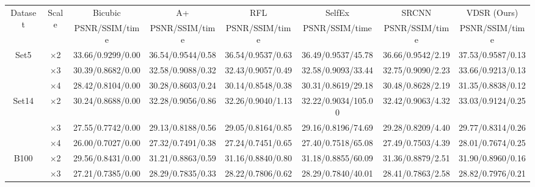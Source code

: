 \documentclass[10pt,twocolumn,letterpaper]{article}
\begin{document}
\begin{table}
\begin{center}
\setlength{\tabcolsep}{2pt}
\small
\begin{tabular}{ | c | c | c | c | c | c | c | c | }
\hline
\multirow{2}{*}{Dataset} & \multirow{2}{*}{Scale} & Bicubic & A+ & RFL & SelfEx & SRCNN & VDSR (Ours)\\
 & & PSNR/SSIM/time & PSNR/SSIM/time & PSNR/SSIM/time & PSNR/SSIM/time & PSNR/SSIM/time & PSNR/SSIM/time\\
\hline
\hline
\multirow{3}{*}{Set5} & $\times$2 & 33.66/0.9299/0.00 & 36.54/{\color{blue}0.9544}/{\color{blue}0.58} & 36.54/0.9537/0.63 & 36.49/0.9537/45.78 & {\color{blue}36.66}/0.9542/2.19 & {\color{red}37.53}/{\color{red}0.9587}/{\color{red}0.13}\\
 & $\times$3 & 30.39/0.8682/0.00 & 32.58/0.9088/{\color{blue}0.32} & 32.43/0.9057/0.49 & 32.58/{\color{blue}0.9093}/33.44 & {\color{blue}32.75}/0.9090/2.23 & {\color{red}33.66}/{\color{red}0.9213}/{\color{red}0.13}\\
 & $\times$4 & 28.42/0.8104/0.00 & 30.28/0.8603/{\color{blue}0.24} & 30.14/0.8548/0.38 & 30.31/0.8619/29.18 & {\color{blue}30.48}/{\color{blue}0.8628}/2.19 & {\color{red}31.35}/{\color{red}0.8838}/{\color{red}0.12}\\
\hline
\hline
\multirow{3}{*}{Set14} & $\times$2 & 30.24/0.8688/0.00 & 32.28/0.9056/{\color{blue}0.86} & 32.26/0.9040/1.13 & 32.22/0.9034/105.00 & {\color{blue}32.42}/{\color{blue}0.9063}/4.32 & {\color{red}33.03}/{\color{red}0.9124}/{\color{red}0.25}\\
 & $\times$3 & 27.55/0.7742/0.00 & 29.13/0.8188/{\color{blue}0.56} & 29.05/0.8164/0.85 & 29.16/0.8196/74.69 & {\color{blue}29.28}/{\color{blue}0.8209}/4.40 & {\color{red}29.77}/{\color{red}0.8314}/{\color{red}0.26}\\
 & $\times$4 & 26.00/0.7027/0.00 & 27.32/0.7491/{\color{blue}0.38} & 27.24/0.7451/0.65 & 27.40/{\color{blue}0.7518}/65.08 & {\color{blue}27.49}/0.7503/4.39 & {\color{red}28.01}/{\color{red}0.7674}/{\color{red}0.25}\\
\hline
\hline
\multirow{3}{*}{B100} & $\times$2 & 29.56/0.8431/0.00 & 31.21/0.8863/{\color{blue}0.59} & 31.16/0.8840/0.80 & 31.18/0.8855/60.09 & {\color{blue}31.36}/{\color{blue}0.8879}/2.51 & {\color{red}31.90}/{\color{red}0.8960}/{\color{red}0.16}\\
 & $\times$3 & 27.21/0.7385/0.00 & 28.29/0.7835/{\color{blue}0.33} & 28.22/0.7806/0.62 & 28.29/0.7840/40.01 & {\color{blue}28.41}/{\color{blue}0.7863}/2.58 & {\color{red}28.82}/{\color{red}0.7976}/{\color{red}0.21}\\

\end{tabular}
\end{center}
\end{table}
\end{document}
